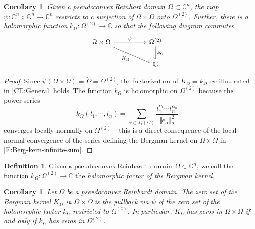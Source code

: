\documentclass[letterpaper,11pt,reqno]{amsart}
\theoremstyle{plain}
\newtheorem{corollary}[equation]{Corollary}
\theoremstyle{definition}
\newtheorem{definition}[equation]{Definition}
\theoremstyle{remark}
\theoremstyle{remark}
\numberwithin{equation}{section}
\newcommand{\norm}[1]{\left\Vert#1\right\Vert}
\newcommand{\wt}{\widetilde}
\newcommand{\cs}{{\mathcal S}}
\newcommand{\cv}{{\mathcal V}}
\newcommand{\C}{{\mathbb C}}
\begin{document}
\begin{corollary}\label{C:comm-diag}
Given a pseudoconvex Reinhart domain  $\Omega \subset \C^n$, the map $\psi: \C^n \times \C^n \to \C^n$ restricts to a surjection of $\Omega \times \Omega$ onto $\Omega^{(2)}$.
Further, there is a holomorphic function $k_\Omega: \Omega^{(2)} \to \C$ so that the following diagram commutes
\begin{equation}\label{CD:General}
\begin{tikzcd}
\Omega \times \Omega \arrow{rr}{\psi} \arrow{rrd}[swap]{K_\Omega} && \Omega^{(2)} \arrow{d}{k_\Omega}\\
&& \C
\end{tikzcd}
\end{equation}
\end{corollary}
\begin{proof}
Since $\psi(\Omega \times \Omega) = \wt\Omega = \Omega^{(2)}$, the factorization of $K_\Omega = k_\Omega \circ \psi$ illustrated in \eqref{CD:General} holds.  
The function $k_\Omega$ is holomorphic on $\Omega^{(2)}$ because the power series 
\begin{equation}\label{E:holo-func-on-Omega2}
k_\Omega(t_1,\cdots,t_n) = \sum_{\alpha \in \cs_2(\Omega)} \frac{ t_1^{\alpha_1} \cdots t_n^{\alpha_n} }{\norm{e_\alpha}_2^2}
\end{equation}
converges locally normally on $\Omega^{(2)}$ -- this is a direct consequence of the local normal convergence of the series defining the Bergman kernel on $\Omega \times \Omega$ in \eqref{E:Berg-kern-infinite-sum}.
\end{proof}

\begin{definition}
Given a pseudoconvex Reinhardt domain $\Omega \subset \C^n$, we call the function $k_\Omega : \Omega^{(2)} \to \C$ the {\em holomorphic factor of the Bergman kernel}.
\end{definition}

\begin{corollary}\label{C:LQK-Reinhardt-shadow}
Let $\Omega$ be a pseudoconvex Reinhardt domain.
The zero set of the Bergman kernel $K_\Omega$ in $\Omega \times \Omega$ is the pullback via $\psi$ of the zero set of the holomorphic factor $k_\Omega$ restricted to $\Omega^{(2)}$.
In particular, $K_\Omega$ has zeros in $\Omega \times \Omega$ if and only if $k_\Omega$ has zeros in $\Omega^{(2)}$.
\end{corollary}
\end{document}
